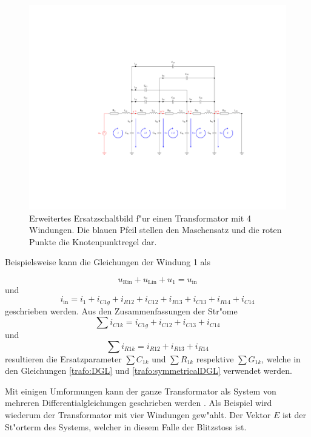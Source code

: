 \begin{refsection}
\begin{figure}
	\centering
	\includegraphics[width=\hsize]{./trafo/images/orig_trafo.pdf}
	\caption[Erweitertes Ersatzschaltbild f"ur einen Transformator mit Maschensatz und Knotenpunkt]{Erweitertes Ersatzschaltbild f"ur einen Transformator mit 4 Windungen. Die blauen Pfeil stellen den Maschensatz und die roten Punkte die Knotenpunktregel dar.}
	\label{trafo:orig}
\end{figure}

Beispielsweise kann die Gleichungen der Windung 1 als 

\begin{equation}
	u_\mathrm{Rin} + u_\mathrm{Lin} + u_1 = u_\mathrm{in}
\end{equation}
und 
\begin{equation}
	i_\mathrm{in} = i_1 + i_{C1g} + i_{R12} + i_{C12} + i_{R13} + i_{C13} + i_{R14} + i_{C14}
\end{equation}
geschrieben werden. Aus den Zusammenfassungen der Str"ome
\begin{equation*}
	\sum i_{C1k} = i_{C1g}+ i_{C12} + i_{C13} + i_{C14}
\end{equation*}
und
\begin{equation*}
	\sum i_{R1k} = i_{R12} + i_{R13} + i_{R14}
\end{equation*}
resultieren die Ersatzparameter $\sum C_{1k}$ und $\sum R_{1k}$ respektive $\sum G_{1k}$, welche in den Gleichungen \ref{trafo:DGL} und \ref{trafo:symmetricalDGL} verwendet werden.

Mit einigen Umformungen kann der ganze Transformator als System von mehreren Differentialgleichungen geschrieben werden \cite{trafo:SeminarCHR}. Als Beispiel wird wiederum der Transformator mit vier Windungen gew"ahlt. Der Vektor $E$ ist der St"orterm des Systems, welcher in diesem Falle der Blitzstoss ist.


\end{refsection}
